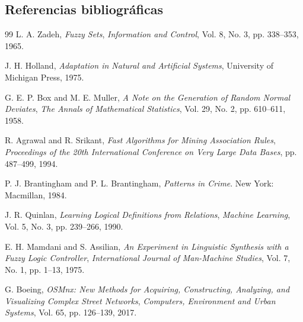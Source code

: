 \documentclass[11pt]{article}
\begin{document}
\subsection{Referencias bibliográficas}
{
\renewcommand{\refname}{}
\vspace{-1.5em}

\begin{thebibliography}{99}
L. A. Zadeh, \textit{Fuzzy Sets}, \textit{Information and Control}, Vol. 8, No. 3, pp. 338--353, 1965.

J. H. Holland, \textit{Adaptation in Natural and Artificial Systems}, University of Michigan Press, 1975.

G. E. P. Box and M. E. Muller, \textit{A Note on the Generation of Random Normal Deviates}, \textit{The Annals of Mathematical Statistics}, Vol. 29, No. 2, pp. 610--611, 1958.

R. Agrawal and R. Srikant, \textit{Fast Algorithms for Mining Association Rules}, \textit{Proceedings of the 20th International Conference on Very Large Data Bases}, pp. 487--499, 1994.

P. J. Brantingham and P. L. Brantingham, \textit{Patterns in Crime}. New York: Macmillan, 1984.

J. R. Quinlan, \textit{Learning Logical Definitions from Relations}, \textit{Machine Learning}, Vol. 5, No. 3, pp. 239--266, 1990.

E. H. Mamdani and S. Assilian, \textit{An Experiment in Linguistic Synthesis with a Fuzzy Logic Controller}, \textit{International Journal of Man-Machine Studies}, Vol. 7, No. 1, pp. 1--13, 1975.

G. Boeing, \textit{OSMnx: New Methods for Acquiring, Constructing, Analyzing, and Visualizing Complex Street Networks}, \textit{Computers, Environment and Urban Systems}, Vol. 65, pp. 126--139, 2017.
\end{thebibliography}
}
\end{document}
